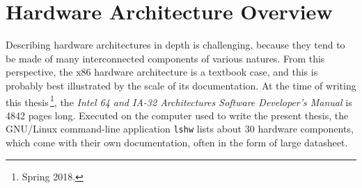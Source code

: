 \section{Hardware Architecture Overview}
\label{sec:usecase:architecture}

Describing hardware architectures in depth is challenging, because they tend to
be made of many interconnected components of various natures.
%
From this perspective, the x86 hardware architecture is a textbook case, and
this is probably best illustrated by the scale of its documentation.
%
At the time of writing this thesis\,\footnote{Spring 2018.}, the \emph{Intel 64
  and IA-32 Architectures Software Developer’s Manual} is 4842 pages long.
%
Executed on the computer used to write the present thesis, the GNU/Linux
command-line application \texttt{lshw} lists about 30 hardware components, which
come with their own documentation, often in the form of large datasheet.
%

